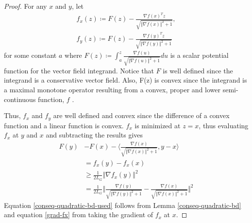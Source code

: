 \documentclass{article}
\begin{document}
\begin{proof}
For any $x$ and $y$, let
\begin{align}
    f_x(z) \coloneqq F(z) - \frac{\nabla f(x)^Tz}{\sqrt{\Vert\nabla f(x)\Vert^2 +1}}, \\
    f_y(z) \coloneqq F(z) - \frac{\nabla f(y)^Tz}{\sqrt{\Vert\nabla f(y)\Vert^2 +1}} 
\end{align}
for some constant $a$ where $\displaystyle F(z) \coloneqq \int_a^z\frac{\nabla f(u)}{\sqrt{\Vert\nabla f(u)\Vert^2 +1}}du$ is a scalar potential function for the vector field integrand. Notice that $F$ is well defined since the integrand is a conservative vector field. Also, F(z) is convex since the integrand is a maximal monotone operator resulting from a convex, proper and lower semi-continuous function, $f$ \citep{minty1962monotone,brezis1973operateurs,rockafellar1970convex}.

Thus, $f_x$ and $f_y$ are well defined and convex since the difference of a convex function and a linear function is convex. $f_x$ is minimized at $z=x$, thus evaluating $f_x$ at $y$ and $x$ and subtracting the results gives
\begin{align}
F(y) &-F(x)-\bigg\langle \frac{\nabla f(x)}{\sqrt{\Vert\nabla f(x)\Vert^2 +1}},y-x \bigg\rangle \nonumber\\
&= f_x(y) - f_x(x) \nonumber\\
&\ge \frac{1}{2L_G} \Vert \nabla f_x(y)\Vert^2 \label{conseq-quadratic-bd-used}\\
&= \frac{1}{2L_G}\bigg\Vert\frac{\nabla f(y)}{\sqrt{\Vert\nabla f(y)\Vert^2 +1}} - \frac{\nabla f(x)}{\sqrt{\Vert\nabla f(x) \Vert^2 +1}} \bigg\Vert^2 \label{grad-fx}
\end{align}
Equation \ref{conseq-quadratic-bd-used} follows from Lemma \ref{conseq-quadratic-bd} and equation \ref{grad-fx} from taking the gradient of $f_x$ at $x$.


\end{proof}
\end{document}

